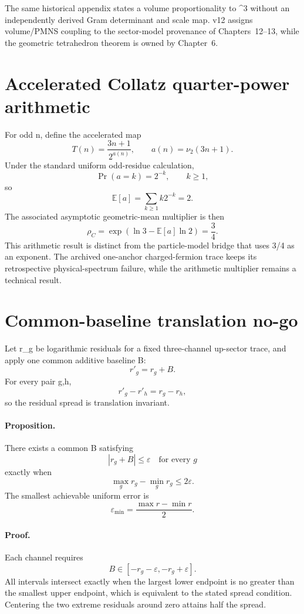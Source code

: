 \documentclass[11pt,a4paper,twoside]{book}
\def\({}%
\def\){}%
\theoremstyle{definition}
\begin{document}
The same historical appendix states a volume proportionality to \(\kappa^3\)
without an independently derived Gram determinant and scale map.  v12 assigns
volume/PMNS coupling to the sector-model provenance of Chapters~12--13, while
the geometric tetrahedron theorem is owned by Chapter~6.

\section{Accelerated Collatz quarter-power arithmetic}

For odd \(n\), define the accelerated map
\[
T(n)=\frac{3n+1}{2^{a(n)}},
\qquad
a(n)=\nu_2(3n+1).
\]
Under the standard uniform odd-residue calculation,
\[
\Pr(a=k)=2^{-k},\qquad k\ge1,
\]
so
\[
\mathbb E[a]=\sum_{k\ge1}k2^{-k}=2.
\]
The associated asymptotic geometric-mean multiplier is then
\[
\boxed{
\rho_C
=\exp\!\left(\ln3-\mathbb E[a]\ln2\right)
=\frac34.
}
\]
This arithmetic result is distinct from the particle-model bridge that uses
\(3/4\) as an exponent.  The archived one-anchor charged-fermion trace keeps its
retrospective physical-spectrum failure, while the arithmetic multiplier
remains a technical result.

\section{Common-baseline translation no-go}

Let \(r_g\) be logarithmic residuals for a fixed three-channel up-sector trace,
and apply one common additive baseline \(B\):
\[
r'_g=r_g+B.
\]
For every pair \(g,h\),
\[
r'_g-r'_h=r_g-r_h,
\]
so the residual spread is translation invariant.

\paragraph{Proposition.}
There exists a common \(B\) satisfying
\[
|r_g+B|\le\varepsilon
\quad\text{for every }g
\]
exactly when
\[
\max_g r_g-\min_g r_g\le2\varepsilon.
\]
The smallest achievable uniform error is
\[
\boxed{
\varepsilon_{\min}
=\frac{\max r-\min r}{2}.
}
\]

\paragraph{Proof.}
Each channel requires
\[
B\in[-r_g-\varepsilon,-r_g+\varepsilon].
\]
All intervals intersect exactly when the largest lower endpoint is no greater
than the smallest upper endpoint, which is equivalent to the stated spread
condition.  Centering the two extreme residuals around zero attains half the
spread.
\end{document}
